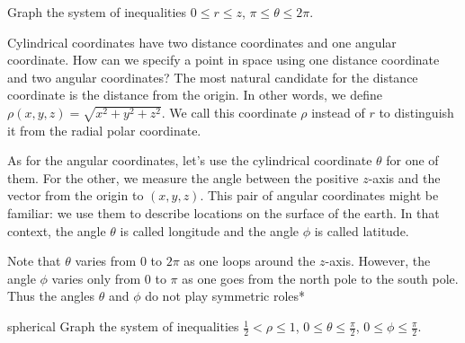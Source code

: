 \documentclass[svgnames]{watsonbook}
\begin{document}
\begin{exercise}{}{}
  Graph the system of inequalities $0 \leq r \leq z$, \: $\pi \leq \theta
  \leq 2\pi$. 
\end{exercise}

Cylindrical coordinates have two distance coordinates and one angular
coordinate. How can we specify a point in space using one distance
coordinate and two angular coordinates? The most natural candidate for
the distance coordinate is the distance from the origin. In other
words, we define $\rho(x,y,z) = \sqrt{x^2 + y^2 + z^2}$. We call this coordinate
$\rho$ instead of $r$ to distinguish it from the radial polar coordinate.

As for the angular coordinates, let's use the cylindrical coordinate
$\theta$ for one of them. For the other, we measure the angle between
the positive $z$-axis and the vector from the origin to
$(x,y,z)$. This pair of angular coordinates might be familiar: we use
them to describe locations on the surface of the earth. In that
context, the angle $\theta$ is called longitude and the angle $\phi$
is called latitude.

Note that $\theta$ varies from 0 to $2\pi$ as one loops around the
$z$-axis. However, the angle $\phi$ varies only from 0 to $\pi$ as one
goes from the north pole to the south pole. Thus the angles $\theta$
and $\phi$ do not play symmetric roles* 

\begin{example}{}{spherical}
  Graph the system of inequalities $\tfrac{1}{2} < \rho \leq 1$, \: $0
  \leq \theta \leq \tfrac{\pi}{2}$, \: $0 \leq \phi \leq \tfrac{\pi}{2}$. 
\end{example}
\end{document}
